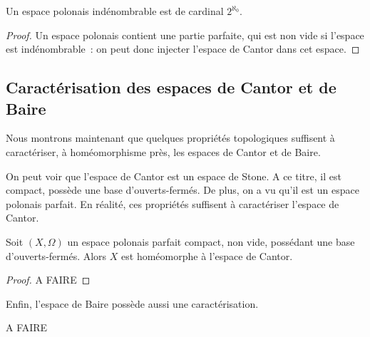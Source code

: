 \begin{corollary}
  Un espace polonais indénombrable est de cardinal $2^{\aleph_0}$.
\end{corollary}

\begin{proof}
  Un espace polonais contient une partie parfaite, qui est non vide si l'espace
  est indénombrable~: on peut donc injecter l'espace de Cantor dans cet espace.
\end{proof}

\subsection{Caractérisation des espaces de Cantor et de Baire}

Nous montrons maintenant que quelques propriétés topologiques suffisent à
caractériser, à homéomorphisme près, les espaces de Cantor et de Baire.

On peut voir que l'espace de Cantor est un espace de Stone. A ce titre, il est
compact, possède une base d'ouverts-fermés. De plus, on a vu qu'il est un
espace polonais parfait. En réalité, ces propriétés suffisent à caractériser
l'espace de Cantor.

\begin{theorem}
  Soit $(X,\Omega)$ un espace polonais parfait compact, non vide, possédant une
  base d'ouverts-fermés. Alors $X$ est homéomorphe à l'espace de Cantor.
\end{theorem}

\begin{proof}
  A FAIRE
\end{proof}

Enfin, l'espace de Baire possède aussi une caractérisation.

A FAIRE

